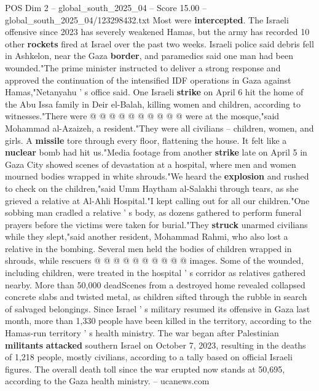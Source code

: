\begin{textsample}{POS Dim 2 – global\_south\_2025\_04 – Score 15.00 – global\_south\_2025\_04/123298432.txt}
Most were \textbf{intercepted}.
The Israeli offensive since 2023 has severely weakened Hamas, but the army has recorded 10 other \textbf{rockets} fired at Israel over the past two weeks.
Israeli police said debris fell in Ashkelon, near the Gaza \textbf{border}, and paramedics said one man had been wounded."The prime minister instructed to deliver a strong response and approved the continuation of the intensified IDF operations in Gaza against Hamas,"Netanyahu ' s office said.
One Israeli \textbf{strike} on April 6 hit the home of the Abu Issa family in Deir el-Balah, killing women and children, according to witnesses."There were @ @ @ @ @ @ @ @ @ @ were at the mosque,"said Mohammad al-Azaizeh, a resident."They were all civilians -- children, women, and girls.
A \textbf{missile} tore through every floor, flattening the house.
It felt like a \textbf{nuclear} bomb had hit us."Media footage from another \textbf{strike} late on April 5 in Gaza City showed scenes of devastation at a hospital, where men and women mourned bodies wrapped in white shrouds."We heard the \textbf{explosion} and rushed to check on the children,"said Umm Haytham al-Salakhi through tears, as she grieved a relative at Al-Ahli Hospital."I kept calling out for all our children."One sobbing man cradled a relative ' s body, as dozens gathered to perform funeral prayers before the victims were taken for burial."They \textbf{struck} unarmed civilians while they slept,"said another resident, Mohammad Rahmi, who also lost a relative in the bombing.
Several men held the bodies of children wrapped in shrouds, while rescuers @ @ @ @ @ @ @ @ @ @ images.
Some of the wounded, including children, were treated in the hospital ' s corridor as relatives gathered nearby.
More than 50,000 deadScenes from a destroyed home revealed collapsed concrete slabs and twisted metal, as children sifted through the rubble in search of salvaged belongings.
Since Israel ' s military resumed its offensive in Gaza last month, more than 1,330 people have been killed in the territory, according to the Hamas-run territory ' s health ministry.
The war began after Palestinian \textbf{militants} \textbf{attacked} southern Israel on October 7, 2023, resulting in the deaths of 1,218 people, mostly civilians, according to a tally based on official Israeli figures.
The overall death toll since the war erupted now stands at 50,695, according to the Gaza health ministry. -- ucanews.com

\end{textsample}
